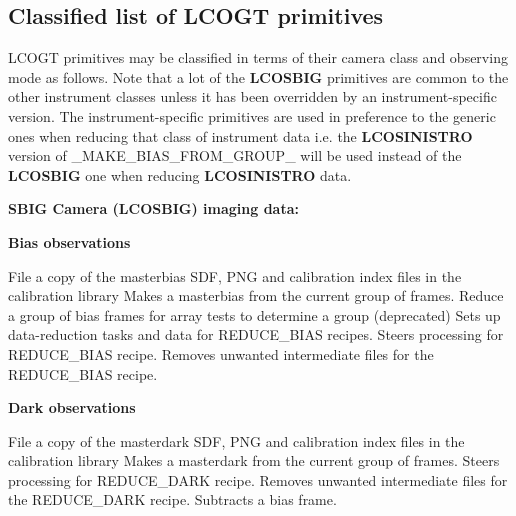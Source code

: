 \documentclass[twoside,11pt,nolof]{starlink}
\providecommand{\task}[1]{\textsf{#1}}
\begin{document}
\newpage
\begin{small}
\section{Classified list of LCOGT primitives\label{ap:classified}}

LCOGT primitives may be classified in terms of their camera class and observing
mode as follows. Note that a lot of the \textbf{LCOSBIG} primitives are common to
the other instrument classes unless it has been overridden by an
instrument-specific version. The instrument-specific primitives are used in
preference to the generic ones when reducing that class of instrument data i.e.
the \textbf{LCOSINISTRO} version of \task{\_MAKE\_BIAS\_FROM\_GROUP\_} will be used
instead of the \textbf{LCOSBIG} one when reducing \textbf{LCOSINISTRO} data.


{\large
\begin{center}
\textbf{SBIG Camera (LCOSBIG) imaging data:}
\end{center}
}


{\large
\begin{center}
\textbf{Bias observations}
\end{center}
}
\begin{description}
File a copy of the masterbias SDF, PNG and calibration index files in the
calibration library
Makes a masterbias from the current group of frames.
Reduce a group of bias frames for array tests to determine a group (deprecated)
Sets up data-reduction tasks and data for REDUCE\_BIAS recipes.
Steers processing for REDUCE\_BIAS recipe.
Removes unwanted intermediate files for the REDUCE\_BIAS recipe.
\end{description}

{\large
\begin{center}
\textbf{Dark observations}
\end{center}
}
\begin{description}
File a copy of the masterdark SDF, PNG and calibration index files in the
calibration library
Makes a masterdark from the current group of frames.
Steers processing for REDUCE\_DARK recipe.
Removes unwanted intermediate files for the REDUCE\_DARK recipe.
Subtracts a bias frame.
\end{description}


\end{small}
\end{document}
